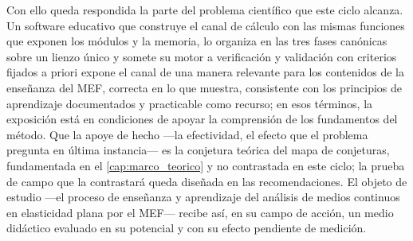 Con ello queda respondida la parte del problema científico que este ciclo alcanza. Un software educativo que construye el canal de cálculo con las mismas funciones que exponen los módulos y la memoria, lo organiza en las tres fases canónicas sobre un lienzo único y somete su motor a verificación y validación con criterios fijados a priori expone el canal de una manera relevante para los contenidos de la enseñanza del MEF, correcta en lo que muestra, consistente con los principios de aprendizaje documentados y practicable como recurso; en esos términos, la exposición está en condiciones de apoyar la comprensión de los fundamentos del método. Que la apoye de hecho —la efectividad, el efecto que el problema pregunta en última instancia— es la conjetura teórica del mapa de conjeturas, fundamentada en el \autoref{cap:marco_teorico} y no contrastada en este ciclo; la prueba de campo que la contrastará queda diseñada en las recomendaciones. El objeto de estudio —el proceso de enseñanza y aprendizaje del análisis de medios continuos en elasticidad plana por el MEF— recibe así, en su campo de acción, un medio didáctico evaluado en su potencial y con su efecto pendiente de medición.
